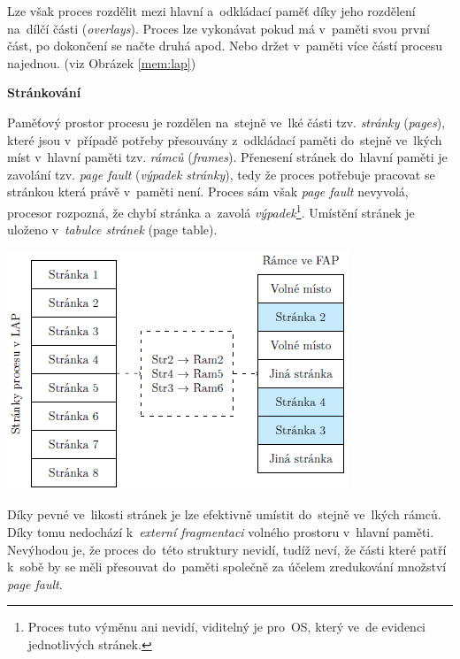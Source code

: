 Lze však proces rozdělit mezi hlavní a~odkládací paměť díky jeho rozdělení na~dílčí části (\emph{overlays}). Proces lze vykonávat pokud má v~paměti svou první část, po dokončení se načte druhá apod. Nebo držet v~paměti více částí procesu najednou. (viz Obrázek \ref{mem:lap})

\begin{Large}
    \vspace{0,5cm}
    \textbf{Stránkování}
\end{Large}

Paměťový prostor procesu je rozdělen na~stejně ve~lké části tzv. \emph{stránky} (\emph{pages}), které jsou v~případě potřeby přesouvány z~odkládací paměti do~stejně ve~lkých míst v~hlavní paměti tzv. \emph{rámců} (\emph{frames}). Přenesení stránek do~hlavní paměti je zavolání tzv. \emph{page fault} (\emph{výpadek stránky}), tedy že proces potřebuje pracovat se stránkou která právě v~paměti není. Proces sám však \emph{page fault} nevyvolá, procesor rozpozná, že chybí stránka a~zavolá \emph{výpadek}\footnote{Proces tuto výměnu ani nevidí, viditelný je pro~OS, který ve~de evidenci jednotlivých stránek.}. Umístění stránek je uloženo v~\emph{tabulce stránek} (page table).

\begin{center}
    \includegraphics[scale=1]{images/mem_page_table.png}
\end{center}

Díky pevné ve~likosti stránek je lze efektivně umístit do~stejně ve~lkých rámců. Díky tomu nedochází k~\emph{externí fragmentaci} volného prostoru v~hlavní paměti. Nevýhodou je, že proces do~této struktury nevidí, tudíž neví, že části které patří k~sobě by se měli přesouvat do~paměti společně za účelem zredukování množství \emph{page fault}.

\vspace{0,5cm}

